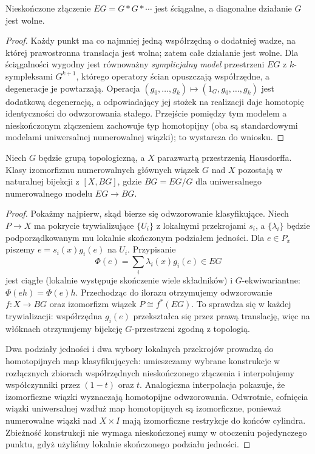 \begin{lemat}
Nieskończone złączenie $EG=G*G*\cdots$ jest ściągalne,
a diagonalne działanie $G$ jest wolne.
\end{lemat}
\begin{proof}
Każdy punkt ma co najmniej jedną współrzędną
o dodatniej wadze, na której prawostronna translacja
jest wolna; zatem całe działanie jest wolne.
Dla ściągalności wygodny jest równoważny
\emph{symplicjalny model} przestrzeni $EG$ z
$k$-sympleksami $G^{k+1}$, którego operatory ścian
opuszczają współrzędne, a degeneracje je powtarzają.
Operacja
$(g_0,\ldots,g_k)\mapsto(1_G,g_0,\ldots,g_k)$
jest dodatkową degeneracją, a odpowiadający jej
stożek na realizacji daje homotopię identyczności
do odwzorowania stałego. Przejście pomiędzy tym modelem
a nieskończonym złączeniem zachowuje typ homotopijny
(oba są standardowymi modelami uniwersalnej
numerowalnej wiązki); to wystarcza do wniosku.
\end{proof}

\begin{twierdzenie}
\label{thm:BG-general-v6}
Niech $G$ będzie grupą topologiczną, a $X$ parazwartą
przestrzenią Hausdorffa. Klasy izomorfizmu numerowalnych głównych
wiązek $G$ nad $X$ pozostają w naturalnej bijekcji z
$[X,BG]$, gdzie $BG=EG/G$ dla uniwersalnego
numerowalnego modelu $EG\to BG$.
\end{twierdzenie}
\begin{proof}
Pokażmy najpierw, skąd bierze się odwzorowanie klasyfikujące.
Niech $P\to X$ ma pokrycie trywializujące $\{U_i\}$
z lokalnymi przekrojami $s_i$, a $\{\lambda_i\}$ będzie
podporządkowanym mu lokalnie skończonym podziałem jedności.
Dla $e\in P_x$ piszemy $e=s_i(x)g_i(e)$ na $U_i$.
Przypisanie
\[
\Phi(e)=\sum_i\lambda_i(x)g_i(e)\in EG
\]
jest ciągłe (lokalnie występuje skończenie wiele składników)
i $G$-ekwiwariantne: $\Phi(eh)=\Phi(e)h$.
Przechodząc do ilorazu otrzymujemy odwzorowanie
$f:X\to BG$ oraz izomorfizm wiązek
$P\cong f^*(EG)$. To sprawdza się w każdej trywializacji:
współrzędna $g_i(e)$ przekształca się przez prawą
translację, więc na włóknach otrzymujemy bijekcję
$G$-przestrzeni zgodną z topologią.

Dwa podziały jedności i dwa wybory lokalnych przekrojów
prowadzą do homotopijnych map klasyfikujących:
umieszczamy wybrane konstrukcje w rozłącznych
zbiorach współrzędnych nieskończonego złączenia
i interpolujemy współczynniki przez $(1-t)$ oraz $t$.
Analogiczna interpolacja pokazuje, że izomorficzne
wiązki wyznaczają homotopijne odwzorowania. Odwrotnie,
cofnięcia wiązki uniwersalnej wzdłuż map homotopijnych
są izomorficzne, ponieważ numerowalne wiązki nad
$X\times I$ mają izomorficzne restrykcje do końców
cylindra. Zbieżność konstrukcji nie wymaga nieskończonej
sumy w otoczeniu pojedynczego punktu, gdyż użyliśmy
lokalnie skończonego podziału jedności.
\end{proof}

